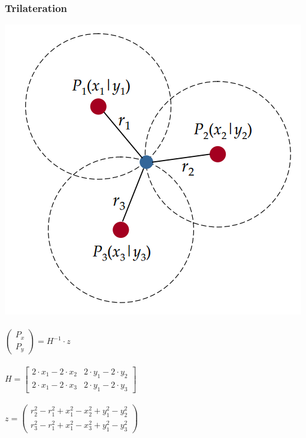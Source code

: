\begin{frame}
  \frametitle{Trilateration}

  \begin{center}
    \includegraphics[scale=0.2]{img/trilat}\\~\\

    $
    \begin{pmatrix}
      P_{x} \\
      P_{y}
    \end{pmatrix}
    =
    H^{-1} \cdot z
    $\\~\\
    $
    H = 
    \begin{bmatrix}
      2 \cdot x_{1} - 2 \cdot x_{2} & 2 \cdot y_{1} - 2 \cdot y_{2} \\
      2 \cdot x_{1} - 2 \cdot x_{3} & 2 \cdot y_{1} - 2 \cdot y_{3}
    \end{bmatrix}
    $\\~\\
    $
    z = 
    \begin{pmatrix}
      r_{2}^2 - r_{1}^2 + x_{1}^2 - x_{2}^2 + y_{1}^2 - y_{2}^2 \\
      r_{3}^2 - r_{1}^2 + x_{1}^2 - x_{3}^2 + y_{1}^2 - y_{3}^2
    \end{pmatrix}
    $
  \end{center}
\end{frame}

